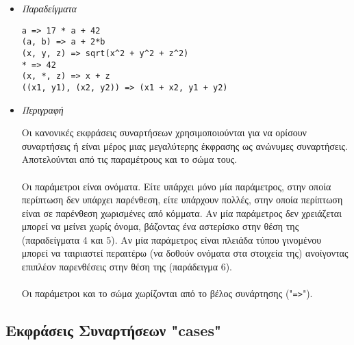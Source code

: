\documentclass[diploma]{softlab-thesis}
\begin{document}
\begin{itemize}
\item \textit{Παραδείγματα}

\begin{verbatim}
a => 17 * a + 42
(a, b) => a + 2*b
(x, y, z) => sqrt(x^2 + y^2 + z^2)
* => 42
(x, *, z) => x + z
((x1, y1), (x2, y2)) => (x1 + x2, y1 + y2)
\end{verbatim}

\item \textit{Περιγραφή}

Οι κανονικές εκφράσεις συναρτήσεων χρησιμοποιούνται για να ορίσουν συναρτήσεις
ή είναι μέρος μιας μεγαλύτερης έκφρασης ως ανώνυμες συναρτήσεις. Αποτελούνται
από τις παραμέτρους και το σώμα τους.
\\\\
Οι παράμετροι είναι ονόματα. Είτε υπάρχει μόνο μία παράμετρος, στην οποία
περίπτωση δεν υπάρχει παρένθεση, είτε υπάρχουν πολλές, στην οποία περίπτωση
είναι σε παρένθεση χωρισμένες από κόμματα. Αν μία παράμετρος δεν χρειάζεται
μπορεί να μείνει χωρίς όνομα, βάζοντας ένα αστερίσκο στην θέση της
(παραδείγματα 4 και 5). Αν μία παράμετρος είναι πλειάδα τύπου γινομένου
μπορεί να ταιριαστεί περαιτέρω (να δοθούν ονόματα στα στοιχεία της) ανοίγοντας
επιπλέον παρενθέσεις στην θέση της (παράδειγμα 6).
\\\\
Οι παράμετροι και το σώμα χωρίζονται από το βέλος συνάρτησης ("\verb|=>|").

\end{itemize}

\newpage
\subsection{Εκφράσεις Συναρτήσεων "cases"}
\label{subsubsec:casessyntaxgr}
\end{document}
